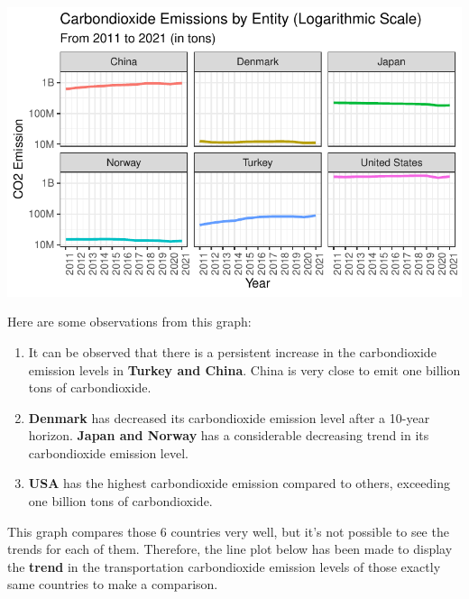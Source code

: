 \documentclass[
  11pt,
  a4paper,
  DIV=11,
  numbers=noendperiod]{scrartcl}
\begin{document}
\includegraphics{analysis_files/figure-pdf/unnamed-chunk-6-1.pdf}

Here are some observations from this graph:

\begin{enumerate}
\def\labelenumi{\arabic{enumi}.}
\item
  It can be observed that there is a persistent increase in the
  carbondioxide emission levels in \textbf{Turkey and China}. China is
  very close to emit one billion tons of carbondioxide.
\item
  \textbf{Denmark} has decreased its carbondioxide emission level after
  a 10-year horizon. \textbf{Japan and Norway} has a considerable
  decreasing trend in its carbondioxide emission level.
\item
  \textbf{USA} has the highest carbondioxide emission compared to
  others, exceeding one billion tons of carbondioxide.
\end{enumerate}

This graph compares those 6 countries very well, but it's not possible
to see the trends for each of them. Therefore, the line plot below has
been made to display the \textbf{trend} in the transportation
carbondioxide emission levels of those exactly same countries to make a
comparison.
\end{document}
